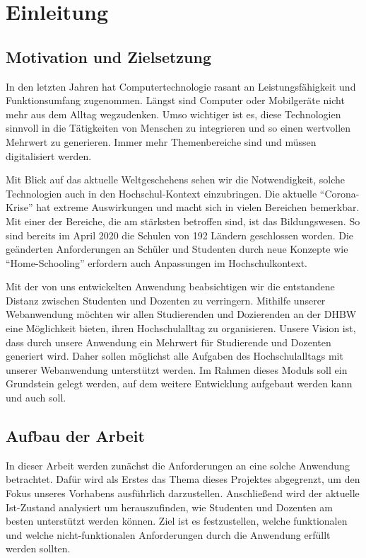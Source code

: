 \chapter{Einleitung}
\section{Motivation und Zielsetzung}
In den letzten Jahren hat Computertechnologie rasant an Leistungsfähigkeit und Funktionsumfang zugenommen.
Längst sind Computer oder Mobilgeräte nicht mehr aus dem Alltag wegzudenken.
Umso wichtiger ist es, diese Technologien sinnvoll in die Tätigkeiten von Menschen zu integrieren und so einen wertvollen Mehrwert zu generieren.
Immer mehr Themenbereiche sind und müssen digitalisiert werden.

Mit Blick auf das aktuelle Weltgeschehens sehen wir die Notwendigkeit, solche Technologien auch in den Hochschul-Kontext einzubringen.
Die aktuelle \enquote{Corona-Krise} hat extreme Auswirkungen und macht sich in vielen Bereichen bemerkbar.
Mit einer der Bereiche, die am stärksten betroffen sind, ist das Bildungswesen.
So sind bereits im April 2020 die Schulen von 192 Ländern geschlossen worden.\autocite[S. 845]{Donohue2020}
Die geänderten Anforderungen an Schüler und Studenten durch neue Konzepte wie \enquote{Home-Schooling} erfordern auch Anpassungen im Hochschulkontext.

Mit der von uns entwickelten Anwendung beabsichtigen wir die entstandene Distanz zwischen Studenten und Dozenten zu verringern. 
Mithilfe unserer Webanwendung möchten wir allen Studierenden und Dozierenden an der DHBW eine Möglichkeit bieten, ihren Hochschulalltag zu organisieren. 
Unsere Vision ist, dass durch unsere Anwendung ein Mehrwert für Studierende und Dozenten generiert wird.
Daher sollen möglichst alle Aufgaben des Hochschulalltags mit unserer Webanwendung unterstützt werden. 
Im Rahmen dieses Moduls soll ein Grundstein gelegt werden, auf dem weitere Entwicklung aufgebaut werden kann und auch soll.

\clearpage
\section{Aufbau der Arbeit} %
In dieser Arbeit werden zunächst die Anforderungen an eine solche Anwendung betrachtet.
Dafür wird als Erstes das Thema dieses Projektes abgegrenzt, um den Fokus unseres Vorhabens ausführlich darzustellen.
Anschließend wird der aktuelle Ist-Zustand analysiert um herauszufinden, wie Studenten und Dozenten am besten unterstützt werden können.
Ziel ist es festzustellen, welche funktionalen und welche nicht-funktionalen Anforderungen durch die Anwendung erfüllt werden sollten.

